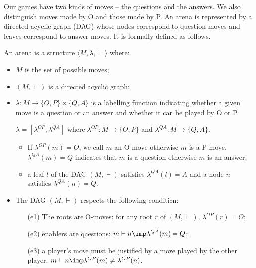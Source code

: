 Our games have two kinds of moves -- the questions and the answers.
We also distinguish moves made by O and those made by P. An arena is
represented by a directed acyclic graph (DAG) whose nodes correspond
to question moves and leaves correspond to answer moves. It is
formally defined as follows.
\begin{definition}[Arena]
An arena is a structure $\langle M, \lambda, \vdash \rangle$ where:
\begin{itemize}
\item $M$ is the set of possible moves;
\item $(M,\vdash)$ is a directed acyclic graph;

\item $\lambda : M \rightarrow \{ O, P\} \times \{Q, A\}$ is a labelling function indicating whether a given move
    is a question or an answer and whether it can be played by O or P.

    $\lambda = [\lambda^{OP},\lambda^{QA}]$ where $\lambda^{OP} : M \rightarrow  \{ O, P\}$
    and $\lambda^{QA} : M \rightarrow  \{ Q, A\}$.

    \begin{itemize}
    \item If $\lambda^{OP} (m) = O$, we call $m$ an O-move otherwise $m$ is a P-move.
    $\lambda^{QA} (m) = Q$ indicates that $m$ is a question otherwise $m$ is an answer.

    \item a leaf $l$ of the DAG $(M,\vdash)$ satisfies $\lambda^{QA} (l) = A$ and a node
    $n$ satisfies $\lambda^{QA} (n) = Q$.
    \end{itemize}

\item The DAG $(M,\vdash)$ respects the following condition:
    \begin{itemize}
    \item[(e1)] The roots are O-moves: for any root $r$ of $(M,\vdash)$, $\lambda^{OP} (r) =
    O$;
    \item[(e2)] enablers are questions: $m \vdash n  \imp \lambda^{QA}(m) =
    Q$;
    \item[(e3)] a player's move must be justified by a move played by the other player:
         $m\vdash n \imp \lambda^{OP}(m) \neq \lambda^{OP}(n)$.
    \end{itemize}
\end{itemize}
\end{definition}

